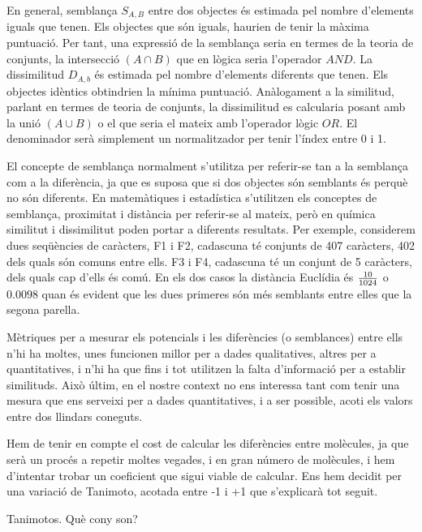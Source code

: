 \documentclass[titlepage,a4paper,12pt]{book}
\begin{document}
En general, semblança $S_{A,B}$ entre dos objectes és estimada pel nombre
d'elements iguals que tenen. Els objectes que són iguals, haurien de tenir la
màxima puntuació. Per tant, una expressió de la semblança seria en termes de la
teoria de conjunts, la intersecció $(A\cap B)$ que en lògica seria l'operador
$AND$. La dissimilitud $D_{A,b}$ és estimada pel nombre d'elements diferents que
tenen. Els objectes idèntics obtindrien la mínima puntuació. Anàlogament a la
similitud, parlant en termes de teoria de conjunts, la dissimilitud es
calcularia posant amb la unió $(A\cup B)$ o el que seria el mateix amb
l'operador lògic $OR$. El denominador serà simplement un normalitzador per tenir
l'índex entre 0 i 1. 

El concepte de semblança normalment s'utilitza per referir-se tan a la semblança
com a la diferència, ja que es suposa que si dos objectes són semblants és
perquè no són diferents. En matemàtiques i estadística s'utilitzen els conceptes
de semblança, proximitat i distància per referir-se al mateix, però en química
similitut i dissimilitut poden portar a diferents resultats. Per exemple,
considerem dues seqüències de caràcters, F1 i F2, cadascuna té conjunts de 407
caràcters, 402 dels quals són comuns entre ells. F3 i F4, cadascuna té un
conjunt de 5 caràcters, dels quals cap d'ells és comú. En els dos casos la
distància Euclídia és $10 \over 1024$  o $0.0098$ quan és evident que les dues
primeres són més semblants entre elles que la segona parella.


Mètriques per a mesurar els potencials i les diferències (o semblances) entre
ells n'hi ha moltes, unes funcionen millor per a dades qualitatives, altres per
a quantitatives, i n'hi ha que fins i tot utilitzen la falta d'informació per a
establir similituds.  Això últim, en el nostre context no ens interessa tant com
tenir una mesura que ens serveixi per a dades quantitatives, i a ser possible,
acoti els valors entre dos llindars coneguts.

Hem de tenir en compte el cost de calcular les diferències entre molècules, ja
que serà un procés a repetir moltes vegades, i en gran número de molècules, i
hem d'intentar trobar un coeficient que sigui viable de calcular.  Ens hem
decidit per una variació de Tanimoto, acotada entre -1 i +1 que s'explicarà tot
seguit.

Tanimotos. Què cony son? %

\end{document}
